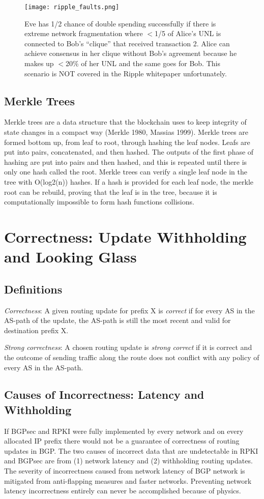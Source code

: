 \documentclass[letterpaper, 10 pt, conference]{ieeeconf}  %
\begin{document}
\begin{figure}[ht!]
	\centering
	\texttt{[image: ripple\_faults.png]}
    \caption{Eve has 1/2 chance of double spending successfully if there is extreme network fragmentation where $<$1/5 of Alice’s UNL is connected to Bob’s “clique” that received transaction 2. Alice can achieve consensus in her clique without Bob’s agreement because he makes up $<$20\% of her UNL and the same goes for Bob. This scenario is NOT covered in the Ripple whitepaper unfortunately.}
   	\end{figure}

\subsection{Merkle Trees}

Merkle trees are a data structure that the blockchain uses to keep integrity of state changes in a compact way (Merkle 1980, Massias 1999). Merkle trees are formed bottom up, from leaf to root, through hashing the leaf nodes. Leafs are put into pairs, concatenated, and then hashed. The outputs of the first phase of hashing are put into pairs and then hashed, and this is repeated until there is only one hash called the root. Merkle trees can verify a single leaf node in the tree with O(log2(n)) hashes. If a hash is provided for each leaf node, the merkle root can be rebuild, proving that the leaf is in the tree, because it is computationally impossible to form hash functions collisions. 



\section{Correctness: Update Withholding and Looking Glass}

\subsection{Definitions}
\textit{Correctness}: A given routing update for prefix X is \textit{correct} if for every AS in the AS-path of the update, the AS-path is still the most recent and valid for destination prefix X. 

\textit{Strong correctness}: A chosen routing update is \textit{strong correct} if it is correct and the outcome of sending traffic along the route does not conflict with any policy of every AS in the AS-path. 

\subsection{Causes of Incorrectness: Latency and Withholding}
If BGPsec and RPKI were fully implemented by every network and on every allocated IP prefix there would not be a guarantee of correctness of routing updates in BGP. The two causes of incorrect data that are undetectable in RPKI and BGPsec are from (1) network latency and (2) withholding routing updates. The severity of incorrectness caused from network latency of BGP network is mitigated from anti-flapping measures and faster networks. Preventing network latency incorrectness entirely can never be accomplished because of physics.
\end{document}
